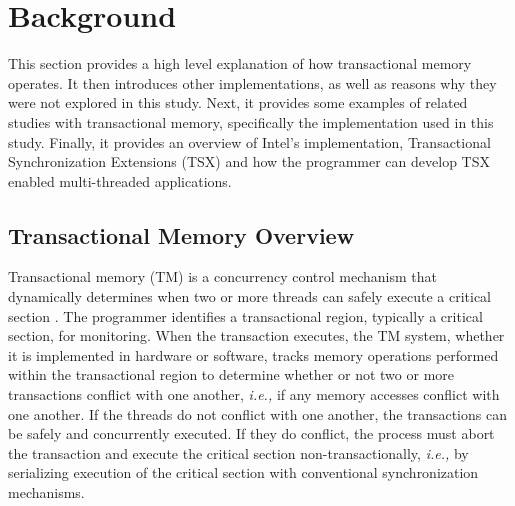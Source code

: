 \documentclass{sig-alternate}
\begin{document}
\section{Background}\label{background}

This section provides a high level explanation of how transactional memory operates.  It
then introduces other implementations, as well as reasons why they were not explored in
this study.  Next, it provides some examples of related studies with transactional memory,
specifically the implementation used in this study.  Finally, it provides an overview of
Intel's implementation, Transactional Synchronization Extensions (TSX) and how the
programmer can develop TSX enabled multi-threaded applications.

\subsection{Transactional Memory Overview}

Transactional memory (TM) is a concurrency control mechanism that dynamically determines
when two or more threads can safely execute a critical section \cite{sle_rajwar}.  The
programmer identifies a transactional region, typically a critical section, for
monitoring.  When the transaction executes, the TM system, whether it is implemented in
hardware or software, tracks memory operations performed within the transactional region
to determine whether or not two or more transactions conflict with one another,
\emph{i.e.,} if any memory accesses conflict with one another.  If the threads do not
conflict with one another, the transactions can be safely and concurrently executed.  If
they do conflict, the process must abort the transaction and execute the critical section
non-transactionally, \emph{i.e.,} by serializing execution of the critical section with
conventional synchronization mechanisms.

\end{document}
